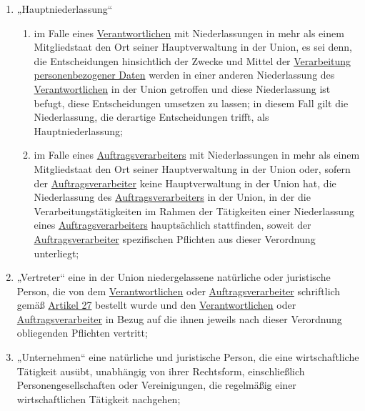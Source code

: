 \begin{enumerate}
  \item „Hauptniederlassung“
  \label{itm:04-16}

  \begin{enumerate}
  
    \item im Falle eines \hyperref[itm:04-7]{Verantwortlichen} mit Niederlassungen in mehr als einem Mitgliedstaat den Ort seiner
     Hauptverwaltung in der Union, es sei denn, die Entscheidungen hinsichtlich der Zwecke und Mittel der \hyperref[itm:04-2]{Verarbeitung}
     \hyperref[itm:04-1]{personenbezogener Daten} werden in einer anderen Niederlassung des \hyperref[itm:04-7]{Verantwortlichen} in der Union getroffen und
     diese Niederlassung ist befugt, diese Entscheidungen umsetzen zu lassen; in diesem Fall gilt die Niederlassung,
     die derartige Entscheidungen trifft, als Hauptniederlassung;
    \label{itm:04-16a}

    \item im Falle eines \hyperref[itm:04-8]{Auftragsverarbeiters} mit Niederlassungen in mehr als einem Mitgliedstaat den Ort seiner
     Hauptverwaltung in der Union oder, sofern der \hyperref[itm:04-8]{Auftragsverarbeiter} keine Hauptverwaltung in der Union hat, die
     Niederlassung des \hyperref[itm:04-8]{Auftragsverarbeiters} in der Union, in der die Verarbeitungstätigkeiten im Rahmen der Tätigkeiten
     einer Niederlassung eines \hyperref[itm:04-8]{Auftragsverarbeiters} hauptsächlich stattfinden, soweit der \hyperref[itm:04-8]{Auftragsverarbeiter}
     spezifischen Pflichten aus dieser Verordnung unterliegt;
    \label{itm:04-16b}

  \end{enumerate}

  \item „Vertreter“ eine in der Union niedergelassene natürliche oder juristische Person, die von dem \hyperref[itm:04-7]{Verantwortlichen}
   oder \hyperref[itm:04-8]{Auftragsverarbeiter} schriftlich gemäß \hyperref[ch:27]{Artikel 27} bestellt wurde und den \hyperref[itm:04-7]{Verantwortlichen} oder
   \hyperref[itm:04-8]{Auftragsverarbeiter} in Bezug auf die ihnen jeweils nach dieser Verordnung obliegenden Pflichten vertritt;
  \label{itm:04-17}

  \item „Unternehmen“ eine natürliche und juristische Person, die eine wirtschaftliche Tätigkeit ausübt, unabhängig von
   ihrer Rechtsform, einschließlich Personengesellschaften oder Vereinigungen, die regelmäßig einer wirtschaftlichen
   Tätigkeit nachgehen;
  \label{itm:04-18}


\end{enumerate}
